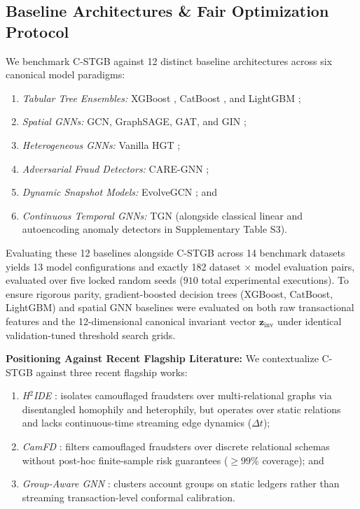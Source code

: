 \subsection{Baseline Architectures \& Fair Optimization Protocol}
\label{sec:baselines_protocol}
We benchmark C-STGB against 12 distinct baseline architectures across six canonical model paradigms:
\begin{enumerate}
    \item \textit{Tabular Tree Ensembles:} XGBoost \citep{chen2016xgboost}, CatBoost \citep{prokhorenkova2018catboost}, and LightGBM \citep{ke2017lightgbm};
    \item \textit{Spatial GNNs:} GCN, Graph\-SAGE, GAT, and GIN \citep{kipf2017semi, hamilton2017inductive, velickovic2018graph, xu2019powerful};
    \item \textit{Heterogeneous GNNs:} Vanilla HGT \citep{hu2020heterogeneous};
    \item \textit{Adversarial Fraud Detectors:} CARE-GNN \citep{dou2020enhancing};
    \item \textit{Dynamic Snapshot Models:} EvolveGCN \citep{pareja2020evolvegcn}; and
    \item \textit{Continuous Temporal GNNs:} TGN \citep{rossi2020temporal} (alongside classical linear and autoencoding anomaly detectors in Supplementary Table S3).
\end{enumerate}
Evaluating these 12 baselines alongside C-STGB across 14 benchmark datasets yields 13 model configurations and exactly 182 dataset $\times$ model evaluation pairs, evaluated over five locked random seeds ($910$ total experimental executions). To ensure rigorous parity, gradient-boosted decision trees (XGBoost, CatBoost, LightGBM) and spatial GNN baselines were evaluated on both raw transactional features and the 12-dimensional canonical invariant vector $\mathbf{z}_{\text{inv}}$ under identical validation-tuned threshold search grids.

\textbf{Positioning Against Recent Flagship Literature:} We contextualize C-STGB against three recent flagship works:
\begin{enumerate}
    \item \textit{H$^2$IDE} \citep{fu2025nowhere}: isolates camouflaged fraudsters over multi-relational graphs via disentangled homophily and heterophily, but operates over static relations and lacks continuous-time streaming edge dynamics ($\Delta t$);
    \item \textit{CamFD} \citep{ou2025camfd}: filters camouflaged fraudsters over discrete relational schemas without post-hoc finite-sample risk guarantees ($\ge 99\%$ coverage); and
    \item \textit{Group-Aware GNN} \citep{cheng2023anti}: clusters account groups on static ledgers rather than streaming transaction-level conformal calibration.
\end{enumerate}

